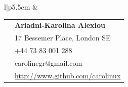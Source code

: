 \documentclass[10pt]{article} %
\begin{document}
\begin{minipage}[t]{0.44\textwidth} %
\vspace{0pt} %


\colorbox{shade}{\textcolor{text1}{
        \begin{tabular}{l|p{5.5cm}}
             &
        \begin{tabular}{l|p{5cm}}
    \raisebox{0pt}{\Smiley} & \textbf{Ariadni-Karolina Alexiou} \\ %
            \raisebox{-1pt}{\textifsymbol{18}}& 17 Bessemer Place, London SE \\ %
            \raisebox{-1pt}{\Mobilefone} & +44 73 83 001 288\\ %
    \raisebox{-1pt}{\Letter} & carolinegr@gmail.com \\ %
    \Keyboard & \href{http://www.github.com/carolinux}{http://www.github.com/carolinux} \\ %
        \end{tabular}  \\ %
\end{tabular}
}
}\\[10pt]









\end{minipage}
\end{document}
